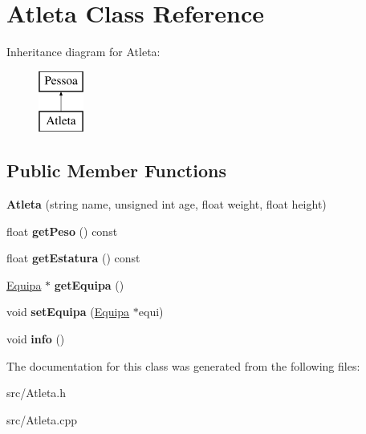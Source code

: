 \hypertarget{class_atleta}{}\section{Atleta Class Reference}
\label{class_atleta}
Inheritance diagram for Atleta\+:\begin{figure}[H]
\begin{center}
\leavevmode
\includegraphics[height=2.000000cm]{class_atleta}
\end{center}
\end{figure}
\subsection*{Public Member Functions}
\begin{DoxyCompactItemize}
\item 
\hypertarget{class_atleta_afd38493a225fe3ae9cb23e2fe41e0297}{}{\bfseries Atleta} (string name, unsigned int age, float weight, float height)\label{class_atleta_afd38493a225fe3ae9cb23e2fe41e0297}

\item 
\hypertarget{class_atleta_a1bc03ab63e8621c634f782806180bdb8}{}float {\bfseries get\+Peso} () const \label{class_atleta_a1bc03ab63e8621c634f782806180bdb8}

\item 
\hypertarget{class_atleta_a2e801fd3feca11002de4cfd087621b5f}{}float {\bfseries get\+Estatura} () const \label{class_atleta_a2e801fd3feca11002de4cfd087621b5f}

\item 
\hypertarget{class_atleta_a8be582bd9aa951b768309f6bca996107}{}\hyperlink{class_equipa}{Equipa} $\ast$ {\bfseries get\+Equipa} ()\label{class_atleta_a8be582bd9aa951b768309f6bca996107}

\item 
\hypertarget{class_atleta_a4e77388fb86a570e76fb581115500cdb}{}void {\bfseries set\+Equipa} (\hyperlink{class_equipa}{Equipa} $\ast$equi)\label{class_atleta_a4e77388fb86a570e76fb581115500cdb}

\item 
\hypertarget{class_atleta_a9a7d709560b68c2cc05c8f9b0d27e864}{}void {\bfseries info} ()\label{class_atleta_a9a7d709560b68c2cc05c8f9b0d27e864}

\end{DoxyCompactItemize}


The documentation for this class was generated from the following files\+:\begin{DoxyCompactItemize}
\item 
src/Atleta.\+h\item 
src/Atleta.\+cpp\end{DoxyCompactItemize}
